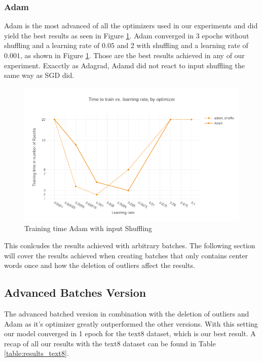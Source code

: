 \subsubsection{Adam}
Adam is the most advanced of all the optimizers used in our experiments and did yield the best results as seen in Figure \ref{fig:results_adam_shuffle}. Adam converged in 3 epochs without shuffling and a learning rate of $0.05$ and 2 with shuffling and a learning rate of $0.001$, as shown in Figure \ref{fig:results_adam_shuffle}. Those are the best results achieved in any of our experiment. Exacctly as Adagrad, Adamd did not react to input shuffling the same way as SGD did.
\begin{figure}[h]
    \centering
            \includegraphics[scale=0.3]{images/results_adam_shuffle} 
    \caption{Training time Adam with input Shuffling}
    \label{fig:results_adam_shuffle}
\end{figure}

This conlcudes the results achieved with arbitrary batches. The following section will cover the results achieved when creating batches that only contains center words once and how the deletion of outliers affect the results. 

\subsection{Advanced Batches Version}
The advanced batched version in combination with the deletion of outliers and Adam as it's optimizer greatly outperformed the other versions. With this setting our model converged in 1 epoch for the text8 dataset, which is our best result. A recap of all our results with the text8 dataset can be found in Table \ref{table:results_text8}. 


